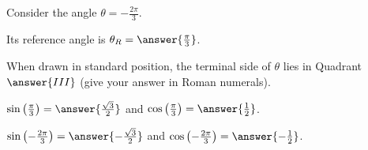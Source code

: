 \documentclass{ximera}
\author{Kenneth Berglund}
\begin{document}
\begin{exercise}
Consider the angle $\theta = -\frac{2\pi}{3}$. 

Its reference angle is $\theta_R = \answer{\frac{\pi}{3}}$.

When drawn in standard position, the terminal side of $\theta$ lies in Quadrant $\answer{III}$ (give your answer in Roman numerals). 

\begin{exercise}
$\sin\left(\frac{\pi}{3}\right) = \answer{\frac{\sqrt{3}}{2}}$ and $\cos\left(\frac{\pi}{3}\right) = \answer{\frac{1}{2}}$.

\begin{exercise}
$\sin\left(-\frac{2\pi}{3}\right) = \answer{-\frac{\sqrt{3}}{2}}$ and $\cos\left(-\frac{2\pi}{3}\right) = \answer{-\frac{1}{2}}$.
\end{exercise}
\end{exercise}

\end{exercise}
\end{document}
